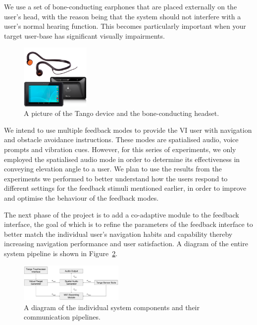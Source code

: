 \documentclass[format=sigconf, review=true, screen=true, anonymous=true]{acmart}
\begin{document}
We use a set of bone-conducting earphones that are placed externally on the user's head, with the reason being that the system should not interfere with a user's normal hearing function. This becomes particularly important when your target user-base has significant visually impairments. 

\begin{figure}
  \centering
  \includegraphics[width=0.3\textwidth]{figures/tango_headphone.png}
  \caption{A picture of the Tango device and the bone-conducting headset.}
  \label{fig:tango}
\end{figure}

We intend to use multiple feedback modes to provide the VI user with navigation and obstacle avoidance instructions. These modes are spatialised audio, voice prompts and vibration cues. However, for this series of experiments, we only employed the spatialised audio mode in order to determine its effectiveness in conveying elevation angle to a user. We plan to use the results from the experiments we performed to better understand how the users respond to different settings for the feedback stimuli mentioned earlier, in order to improve and optimise the behaviour of the feedback modes. 

The next phase of the project is to add a co-adaptive module to the feedback interface, the goal of which is to refine the parameters of the feedback interface to better match the individual user's navigation habits and capability thereby increasing navigation performance and user satisfaction. A diagram of the entire system pipeline is shown in Figure~\ref{fig:pipeline}.

\begin{figure}
  \centering
  \includegraphics[width=0.45\textwidth]{figures/pipeline.pdf}
  \caption{A diagram of the individual system components and their communication pipelines. }
  \label{fig:pipeline}
\end{figure}
\end{document}
